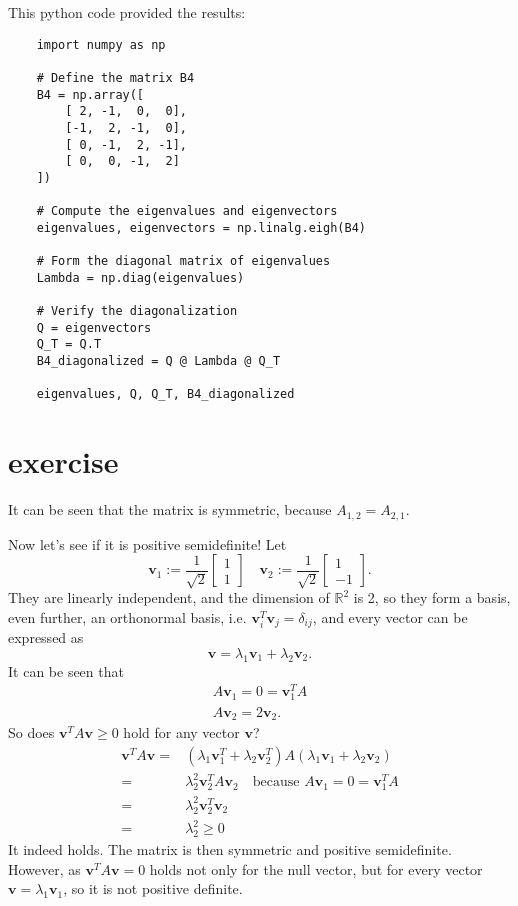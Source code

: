 \documentclass{article}
\begin{document}
This python code provided the results:
\begin{lstlisting}
    import numpy as np

    # Define the matrix B4
    B4 = np.array([
        [ 2, -1,  0,  0],
        [-1,  2, -1,  0],
        [ 0, -1,  2, -1],
        [ 0,  0, -1,  2]
    ])
    
    # Compute the eigenvalues and eigenvectors
    eigenvalues, eigenvectors = np.linalg.eigh(B4)
    
    # Form the diagonal matrix of eigenvalues
    Lambda = np.diag(eigenvalues)
    
    # Verify the diagonalization
    Q = eigenvectors
    Q_T = Q.T
    B4_diagonalized = Q @ Lambda @ Q_T
    
    eigenvalues, Q, Q_T, B4_diagonalized    
\end{lstlisting}

\section{exercise}
It can be seen that the matrix is symmetric, because $A_{1,2} = A_{2,1}$.

Now let's see if it is positive semidefinite! Let
\[\mathbf{v}_1 := \frac{1}{{\sqrt 2 }}\begin{bmatrix}
        1 \\
        1
    \end{bmatrix}\quad \mathbf{v}_2 := \frac{1}{{\sqrt 2 }}\begin{bmatrix}
        1 \\
        -1
    \end{bmatrix}.\]
They are linearly independent, and the dimension of \(\mathbb{R}^2\) is 2,
so they form a basis, even further,
an orthonormal basis, i.e. \(\mathbf{v}_i^T \mathbf{v}_j = \delta_{ij}\), and every vector can be expressed as
\[\mathbf{v} = \lambda_1 \mathbf{v}_1 + \lambda_2 \mathbf{v}_2.\]
It can be seen that
\[\begin{array}{ccccc}
        A\mathbf{v}_1 = 0 = \mathbf{v}_1^T A \\
        A\mathbf{v}_2 = 2\mathbf{v}_2.
    \end{array}\]
So does \(\mathbf{v}^T A \mathbf{v} \ge 0\) hold for any vector $\mathbf{v}$?
\begin{align*}
    \mathbf{v}^T A \mathbf{v} = & (\lambda_1 \mathbf{v}_1^T + \lambda_2 \mathbf{v}_2^T)A(\lambda_1 \mathbf{v}_1 + \lambda_2 \mathbf{v}_2) \\
    =                           & \lambda_2^2 \mathbf{v}_2^T A \mathbf{v}_2 \quad \text{because } A\mathbf{v}_1 = 0 = \mathbf{v}_1^T A    \\
    =                           & \lambda_2^2 \mathbf{v}_2^T \mathbf{v}_2                                                                 \\
    =                           & \lambda_2^2 \geq 0
\end{align*}
It indeed holds. The matrix is then symmetric and positive semidefinite.
However, as $\mathbf{v}^T A \mathbf{v} = 0$ holds not only for the null vector,
but for every vector $\mathbf{v} = \lambda_1 \mathbf{v}_1$,
so it is not positive definite.
\end{document}
